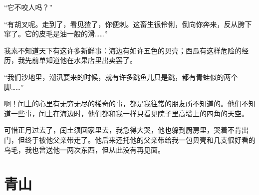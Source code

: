 \documentclass[12pt,UTF-8,openany]{ctexbook}
\begin{document}
\begin{large}
    “它不咬人吗？”
    
    “有胡叉呢。走到了，看见猹了，你便刺。这畜生很伶俐，倒向你奔来，反从胯下窜了。它的皮毛是油一般的滑……”
    
    我素不知道天下有这许多新鲜事：海边有如许五色的贝壳；西瓜有这样危险的经历，我先前单知道他在水果店里出卖罢了。
    
    “我们沙地里，潮汛要来的时候，就有许多跳鱼儿只是跳，都有青蛙似的两个脚……”
    
    啊！闰土的心里有无穷无尽的稀奇的事，都是我往常的朋友所不知道的。他们不知道一些事，闰土在海边时，他们都和我一样只看见院子里高墙上的四角的天空。
    
    可惜正月过去了，闰土须回家里去，我急得大哭，他也躲到厨房里，哭着不肯出门，但终于被他父亲带走了。他后来还托他的父亲带给我一包贝壳和几支很好看的鸟毛，我也曾送他一两次东西，但从此没有再见面。
    
\end{large}



\chapter{青山}
\end{document}
